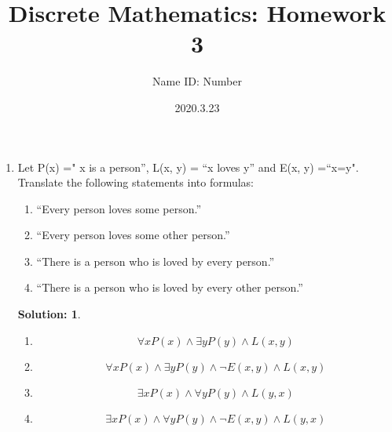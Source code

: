 \documentclass{article}
\title{Discrete Mathematics:  Homework 3}
\author{Name  \quad  \quad ID: Number}
\date{2020.3.23}
\theoremstyle{break}
\newtheorem*{solution*}{\textbf{Solution:} }
\begin{document}
\maketitle
\begin{enumerate}
        \item Let P(x) =" x is  a  person”, L(x, y)  =  “x loves y”  and E(x, y)  =“x=y".
        \\Translate the following statements into formulas:
        \begin{enumerate}
                \item “Every person loves some person.”
                \item “Every person loves some other person.”
                \item “There is a person who is loved by every person.”
                \item “There is a person who is loved by every other person.”
        \end{enumerate}
        \begin{solution*}
                \leavevmode
                \begin{enumerate}
                        \item \[
                                \forall x P(x)\land \exists y P(y) \land L(x,y) 
                        \]
                        \item \[
                                \forall x P(x) \land \exists y P(y) \land \lnot E(x,y) \land L(x,y)
                        \]
                        \item \[
                                \exists x P(x) \land \forall y P(y) \land L(y,x)
                        \]
                        \item \[
                                \exists x P(x) \land \forall y P(y)  \land \lnot E(x,y)  \land L(y,x)
                        \]
                \end{enumerate}
        \end{solution*}

        \newpage


\end{enumerate}
\end{document}
